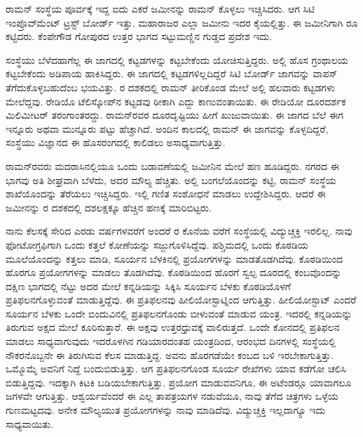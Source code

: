 ರಾಮನ್ ಸಂಸ್ಥೆಯ ಪೂರ್ವಕ್ಕೆ ಇದ್ದ ಐದು ಎಕರೆ ಜಮೀನನ್ನು ರಾಮನ್ ಕೊಳ್ಳಲು ಇಚ್ಚಿಸಿದರು. ಆಗ ಸಿಟಿ ಇಂಪ್ರೊವ್‍ಮೆಂಟ್ ಟ್ರಸ್ಟ್ ಬೋರ್ಡ್ ಇತ್ತು. ಮಹಾರಾಜರ ಎಲ್ಲಾ ಜಮೀನು ಇದರ ಕೈಯಲ್ಲಿತ್ತು. ಈ ಜಮೀನಿಗಾಗಿ  ರೂ ಕಟ್ಟಿದರು. ಕೆಂಪೇಗೌಡ ಗೋಪುರದ ಉತ್ತರ ಭಾಗದ ಸಟ್ಟುಮಣ್ಣಿನ ಗುಡ್ಡದ ಪ್ರದೇಶ ಇದು.

ಸಂಸ್ಥೆಯು ಬೆಳೆದಹಾಗೆಲ್ಲ ಈ ಜಾಗದಲ್ಲಿ ಕಟ್ಟಡಗಳನ್ನು ಕಟ್ಟಬೇಕೆಂದು ಯೋಚಿಸುತ್ತಿದ್ದರು. ಅಲ್ಲಿ ಹೊಸ ಗ್ರಂಥಾಲಯ ಕಟ್ಟಬೇಕೆಂದು ಅಡಿಪಾಯ ಹಾಕಿಸಿದ್ದರು. ಈ ಜಾಗದಲ್ಲಿ ಕಟ್ಟಡಗಳಿಲ್ಲದಿದ್ದರೆ ಸಿಟಿ ಬೋರ್ಡ್ ಜಾಗವನ್ನು ವಾಪಸ್ ತೆಗೆದುಕೊಳ್ಳಬಹುದೆಂಬ ಭಯವಿತ್ತು. ರ ದಶಕದಲ್ಲಿ ರಾಮನ್ ತೀರಿಕೊಂಡ ಮೇಲೆ ಅಲ್ಲಿ ಹಲವಾರು ಕಟ್ಟಡಗಳು ಮೇಲೆದ್ದವು. ರೇಡಿಯೊ ಟೆಲಿಸ್ಕೋಪ್‍ನ ಕಟ್ಟಡವು ಠೀಕಾಗಿ ಎದ್ದು ಕಾಣುವಂತಾಯಿತು. ಈ ರೇಡಿಯೋ ದೂರದರ್ಶಕ ಮಿಲಿಮೀಟರ್ ತರಂಗಾಂತರದ್ದು. ರಾಮನ್‍ರವರ ದೂರದೃಷ್ಟಿಯು ಹೀಗೆ ಖುಜುವಾಯಿತು. ಈ ಜಾಗದ ಬೆಲೆ ಈಗ ಇನ್ನೂರು ಅಥವಾ ಮುನ್ನೂರು ಪಟ್ಟು ಹೆಚ್ಚಾಗಿದೆ. ಅಂದಿನ ಕಾಲದಲ್ಲಿ ರಾಮನ್ ಈ ಜಾಗವನ್ನು ಕೊಳ್ಳದಿದ್ದರೆ, ಸಂಸ್ಥೆಯು ವಿಜ್ಞಾನದ ಈ ಹೊಸರಂಗದಲ್ಲಿ ಕಾಲಿಡಲು ಅಸಾಧ್ಯವಾಗುತ್ತಿತ್ತು.

ರಾಮನ್‍ರವರು ಮದರಾಸಿನಲ್ಲಿಯೂ ಒಂದು ಬಡಾವಣೆಯಲ್ಲಿ ಜಮೀನಿನ ಮೇಲೆ ಹಣ ಹೂಡಿದ್ದರು. ನಗರದ ಈ ಭಾಗವು ಅತಿ ಶೀಘ್ರವಾಗಿ ಬೆಳೆದು, ಅದರ ಮೌಲ್ಯ ಹೆಚ್ಚಿತು. ಅಲ್ಲಿ ಬಂಗಲೆಯೊಂದನ್ನು ಕಟ್ಟಿ, ರಾಮನ್ ಸಂಸ್ಥೆಯ ಶಾಖೆಯೊಂದನ್ನು ತೆರೆಯಲು ಇಚ್ಚಿಸಿದ್ದರು. ಇಲ್ಲಿ ಗಣಿತ ಸಂಶೋಧನೆ ಮಾಡಲು ಉದ್ದೇಶಿಸಿದ್ದರು. ಆದರೆ ಈ ಜಮೀನನ್ನು ರ ದಶಕದಲ್ಲಿ ದಶಲಕ್ಷಕ್ಕೂ ಹೆಚ್ಚಿನ ಹಣಕ್ಕೆ ಮಾರಿಬಿಟ್ಟರು.



ನಾನು ಕೆಲಸಕ್ಕೆ ಸೇರಿದ ಎರಡು ವರ್ಷಗಳವರೆಗೆ ಅಂದರೆ ರ ಕೊನೆಯ ವರೆಗೆ ಸಂಸ್ಥೆಯಲ್ಲಿ ವಿದ್ಯುಚ್ಚಕ್ತಿ ಇರಲಿಲ್ಲ. ನಾವು ಫೋಟೋಗ್ರಫಿಗಾಗಿ ಒಂದು ಕತ್ತಲೆ ಕೋಣೆಯನ್ನು ಸಜ್ಜುಗೊಳಿಸಿದ್ದೆವು. ಪಶ್ಚಿಮದಲ್ಲಿ ಒಂದು ಕೊಠಡಿಯ ಮೂಲೆಯೊಂದನ್ನು ಕತ್ತಲು ಮಾಡಿ, ಸೂರ್ಯನ ಬೆಳಕಿನಲ್ಲಿ ಪ್ರಯೋಗಗಳನ್ನು ಮಾಡತೊಡಗಿದೆವು. ಕೊಠಡಿಯಿಂದ ಹೊರಗೂ ಪ್ರಯೋಗಗಳನ್ನು ಮಾಡಲು ತೊಡಗಿದೆವು. ಕೊಠಡಿಯಿಂದ ಹೊರಗೆ ಸ್ವಲ್ಪ ದೂರದಲ್ಲಿ ಕಂಬವೊಂದನ್ನು ದಕ್ಷಿಣ ಭಾಗದಲ್ಲಿ ನೆಟ್ಟು ಅದರ ಮೇಲೆ ಕನ್ನಡಿಯನ್ನು ಸಿಕ್ಕಿಸಿ ಸೂರ್ಯನ ಬೆಳಕು ಕೊಠಡಿಯೊಳಗೆ ಪ್ರತಿಫಲನಗೊಳ್ಳುವಂತೆ ಮಾಡುತ್ತಿದ್ದೆವು. ಈ ಪ್ರತಿಫಲನವು ಹೀಲಿಯೋಸ್ಟಾಟ್ನಿಂದ ಆಗುತ್ತಿತ್ತು. ಹೀಲಿಯೋಸ್ಟಾಟ್ ಎಂದರೆ ಸೂರ್ಯನ ಬೆಳಕು ಒಂದೇ ಬಿಂದುವಿನಲ್ಲಿ ಪ್ರತಿಫಲನಗೊಂಡು ಬೀಳುವಂತೆ ಮಾಡುವ ಯಂತ್ರ. ಇದರಲ್ಲಿ ಕನ್ನಡಿಯನ್ನು ತಿರುಗುವ ಅಕ್ಷದ ಮೇಲೆ ಕೂರಿಸುತ್ತಾರೆ. ಈ ಅಕ್ಷವು ಉತ್ತರಧ್ರುವಕ್ಕೆ ವಾಲಿರುತ್ತದೆ. ಒಂದೇ ಕೋನದಲ್ಲಿ ಪ್ರತಿಫಲನ ಮಾಡಲು ಸಾಧ್ಯವಾಗುವುದು ಇದರೊಳಗಿನ ಗಡಿಯಾರದಂತಹ ಯಂತ್ರದಿಂದ, ಆರಂಭದ ದಿನಗಳಲ್ಲಿ ಸಂಸ್ಥೆಯಲ್ಲಿ ನೌಕರನೊಬ್ಬನೇ ಈ ತಿರುಗಿಸುವ ಕೆಲಸ ಮಾಡುತ್ತಿದ್ದ. ಅವನು ಹೊರಗಡೆಯೇ ಕಂಬದ ಬಳಿ ಇರಬೇಕಾಗುತ್ತಿತ್ತು. ಒಮ್ಮೊಮ್ಮೆ ಅವನಿಗೆ ನಿದ್ದೆ ಬಂದುಬಿಡುತ್ತಿತ್ತು. ಆಗ ಪ್ರತಿಫಲನಗೊಂಡ ಸೂರ್ಯ ರೇಖೆಗಳು ಯಾವ ಕಡೆಗೋ ಚಲಿಸಿ ಬಿಡುತ್ತಿದ್ದವು. ಇದಕ್ಕಾಗಿ ಕಿಟಕಿ ಬಡಿಯಬೇಕಾಗುತ್ತಿತ್ತು. ಪ್ರಯೋಗ ಮಾಡುವವನಿಗೂ, ಈ ಅಟೆಂಡರ್‍ಗೂ ಯಾವಾಗಲೂ ಜಗಳವೇ ಆಗುತ್ತಿತ್ತು. ಆಶ್ವರ್ಯವೆಂದರೆ ಈ ಎಲ್ಲ ತಾಪತ್ರಯಗಳ ನಡುವೆಯೂ, ನಾವು ತೆಗೆದ ಚಿತ್ರಗಳು ಒಳ್ಳೆಯ ಗುಣಮಟ್ಟದವು. ಅನೇಕ ಮೌಲ್ಯಯುತ ಪ್ರಯೋಗಗಳನ್ನು ನಾವು ಮಾಡಿದೆವು. ವಿದ್ಯುಚ್ಚಕ್ತಿ ಇಲ್ಲದಾಗ್ಯೂ ಇದು ಸಾಧ್ಯವಾಯಿತು.

